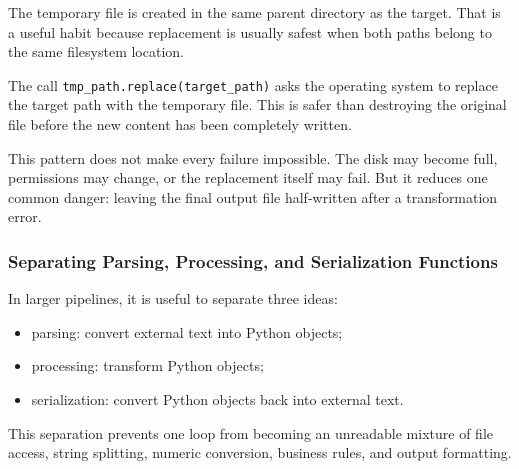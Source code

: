 The temporary file is created in the same parent directory as the target. That is a useful habit because replacement is usually safest when both paths belong to the same filesystem location.

The call \texttt{tmp\_path.replace(target\_path)} asks the operating system to replace the target path with the temporary file. This is safer than destroying the original file before the new content has been completely written.

This pattern does not make every failure impossible. The disk may become full, permissions may change, or the replacement itself may fail. But it reduces one common danger: leaving the final output file half-written after a transformation error.

\subsubsection{Separating Parsing, Processing, and Serialization Functions}

In larger pipelines, it is useful to separate three ideas:

\begin{itemize}
    \item parsing: convert external text into Python objects;
    \item processing: transform Python objects;
    \item serialization: convert Python objects back into external text.
\end{itemize}

This separation prevents one loop from becoming an unreadable mixture of file access, string splitting, numeric conversion, business rules, and output formatting.

